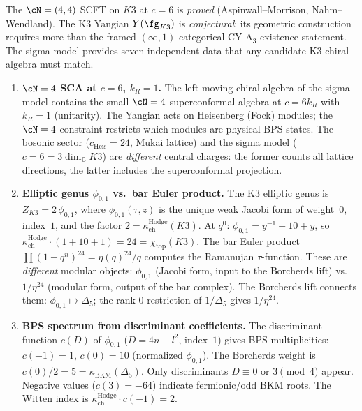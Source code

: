 The $\cN = (4,4)$ SCFT on $K3$ at $c = 6$ is \emph{proved}
(Aspinwall--Morrison, Nahm--Wendland). The K3 Yangian $Y(\fg_{K3})$
is \emph{conjectural}; its geometric construction requires more than
the framed \((\infty,1)\)-categorical CY-A$_3$ existence statement. The
sigma model provides seven
independent data that any candidate K3 chiral algebra must match.

\begin{enumerate}
\item \textbf{$\cN = 4$ SCA at $c = 6$, $k_R = 1$.}
 The left-moving chiral algebra of the sigma model contains the
 small $\cN = 4$ superconformal algebra at $c = 6 k_R$ with $k_R = 1$
 (unitarity). The Yangian acts on Heisenberg (Fock) modules; the
 $\cN = 4$ constraint restricts which modules are physical BPS states.
 The bosonic sector ($c_{\mathrm{Heis}} = 24$, Mukai lattice) and the
 sigma model ($c = 6 = 3 \dim_{\mathbb{C}} K3$) are \emph{different}
 central charges: the former counts all lattice directions, the latter
 includes the superconformal projection.

\item \textbf{Elliptic genus $\phi_{0,1}$ vs.\ bar Euler product.}
 The K3 elliptic genus is $Z_{K3} = 2\,\phi_{0,1}$, where
 $\phi_{0,1}(\tau, z)$ is the unique weak Jacobi form of weight~$0$,
 index~$1$, and the factor $2 = \kappa_{\mathrm{ch}}^{\mathrm{Hodge}}(K3)$.
 At $q^0$: $\phi_{0,1} = y^{-1} + 10 + y$,
 so $\kappa_{\mathrm{ch}}^{\mathrm{Hodge}} \cdot (1 + 10 + 1) = 24 = \chi_{\mathrm{top}}(K3)$.
 The bar Euler product $\prod(1 - q^n)^{24} = \eta(q)^{24}/q$ computes
 the Ramanujan $\tau$-function.
 These are \emph{different} modular objects: $\phi_{0,1}$ (Jacobi form,
 input to the Borcherds lift) vs.\ $1/\eta^{24}$ (modular form, output
 of the bar complex). The Borcherds lift connects them:
 $\phi_{0,1} \mapsto \Delta_5$; the rank-$0$ restriction of
 $1/\Delta_5$ gives $1/\eta^{24}$.

\item \textbf{BPS spectrum from discriminant coefficients.}
 The discriminant function $c(D)$ of $\phi_{0,1}$ ($D = 4n - l^2$,
 index~$1$) gives BPS multiplicities: $c(-1) = 1$, $c(0) = 10$
 (normalized $\phi_{0,1}$).
 The Borcherds weight is $c(0)/2 = 5 = \kappa_{\mathrm{BKM}}(\Delta_5)$.
 Only discriminants $D \equiv 0$ or $3 \pmod{4}$ appear.
 Negative values ($c(3) = -64$) indicate fermionic/odd BKM roots.
 The Witten index is $\kappa_{\mathrm{ch}}^{\mathrm{Hodge}} \cdot c(-1) = 2$.


\end{enumerate}
